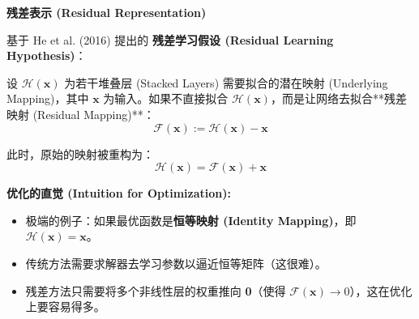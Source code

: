 \documentclass[border=12pt, varwidth=16cm]{standalone}
\begin{document}
\linespread{1.35}\selectfont 

\noindent
\textbf{残差表示 (Residual Representation)}

\vspace{0.2cm}

\noindent
基于 He et al. (2016) 提出的 \textbf{残差学习假设 (Residual Learning Hypothesis)}：

\vspace{0.2cm}

设 $\mathcal{H}(\mathbf{x})$ 为若干堆叠层 (Stacked Layers) 需要拟合的潜在映射 (Underlying Mapping)，其中 $\mathbf{x}$ 为输入。如果不直接拟合 $\mathcal{H}(\mathbf{x})$，而是让网络去拟合**残差映射 (Residual Mapping)**：
\begin{equation*}
    \mathcal{F}(\mathbf{x}) := \mathcal{H}(\mathbf{x}) - \mathbf{x}
\end{equation*}

\noindent
此时，原始的映射被重构为：
\begin{equation*}
    \mathcal{H}(\mathbf{x}) = \mathcal{F}(\mathbf{x}) + \mathbf{x}
\end{equation*}

\vspace{0.1cm}

\noindent
\textbf{优化的直觉 (Intuition for Optimization):}
\begin{itemize}
    \item 极端的例子：如果最优函数是\textbf{恒等映射 (Identity Mapping)}，即 $\mathcal{H}(\mathbf{x}) = \mathbf{x}$。
    \item 传统方法需要求解器去学习参数以逼近恒等矩阵（这很难）。
    \item 残差方法只需要将多个非线性层的权重推向 \textbf{0}（使得 $\mathcal{F}(\mathbf{x}) \to 0$），这在优化上要容易得多。
\end{itemize}
\end{document}
